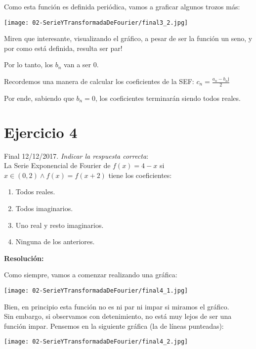 \documentclass[11pt]{article}
\def\imj{\mathrm{j}}
\begin{document}
	Como esta función es definida periódica, vamos a graficar algunos trozos más:
	\begin{center}
		\texttt{[image: 02-SerieYTransformadaDeFourier/final3\_2.jpg]}
	\end{center}

	Miren que interesante, visualizando el gráfico, a pesar de ser la función un seno, y por como está definida, resulta ser par!
	
	Por lo tanto, los $b_{n}$ van a ser $0$.
	
	Recordemos una manera de calcular los coeficientes de la SEF: $c_{n}=\frac{a_{n}-b_{n}\imj}{2}$
	
	Por ende, sabiendo que $b_{n}=0$, los coeficientes terminarán siendo todos reales.
	
	\section{Ejercicio 4}
	Final 12/12/2017. \textit{Indicar la respuesta correcta}:\\
	La Serie Exponencial de Fourier de $f(x)=4-x$ si $x\in(0,2) \wedge f(x)=f(x+2)$ tiene los coeficientes:
	\renewcommand{\labelenumi}{\alph{enumi})}
	\begin{enumerate}
		\item Todos reales.
		\item Todos imaginarios.
		\item Uno real y resto imaginarios.
		\item Ninguna de los anteriores.
	\end{enumerate}

	\textbf{Resolución:}
	
	Como siempre, vamos a comenzar realizando una gráfica:
	\begin{center}
		\texttt{[image: 02-SerieYTransformadaDeFourier/final4\_1.jpg]}
	\end{center}

	Bien, en principio esta función no es ni par ni impar si miramos el gráfico. \\
	Sin embargo, si observamos con detenimiento, no está muy lejos de ser una función impar. Pensemos en la siguiente gráfica (la de líneas punteadas):
	
	\begin{center}
		\texttt{[image: 02-SerieYTransformadaDeFourier/final4\_2.jpg]}
	\end{center}
\end{document}
